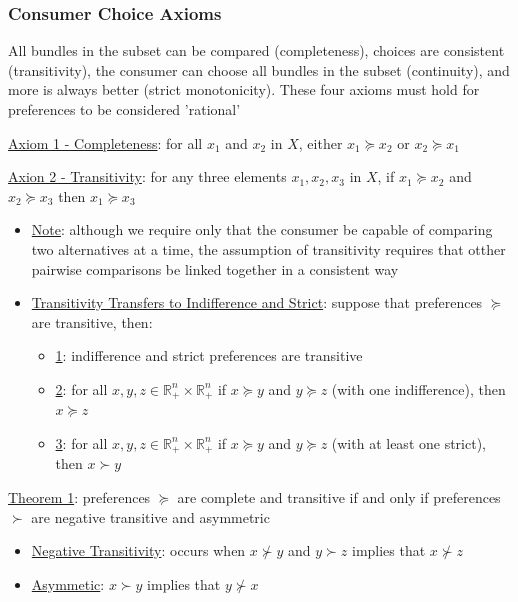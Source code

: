 \documentclass{article}
\begin{document}
\subsubsection{Consumer Choice Axioms}
All bundles in the subset can be compared (completeness), choices are consistent (transitivity), the consumer can choose all bundles in the subset (continuity), and more is always better (strict monotonicity). These four axioms must hold for preferences to be considered 'rational' \par \vspace{0.3em}
  \underline{Axiom 1 - Completeness}: for all $x_{1}$ and $x_{2}$ in $X$, either $x_{1} \succeq x_{2}$ or $x_{2} \succeq x_{1}$ \par
  \underline{Axion 2 - Transitivity}: for any three elements $x_{1}, x_{2}, x_{3}$ in $X$, if $x_{1} \succeq x_{2}$ and $x_{2} \succeq x_{3}$ then $x_{1} \succeq x_{3}$
  \begin{itemize}
    \item  \underline{Note}: although we require only that the consumer be capable of comparing two alternatives at a time, the assumption of transitivity requires that otther pairwise comparisons be linked together in a consistent way
    \item  \underline{Transitivity Transfers to Indifference and Strict}: suppose that preferences $\succeq$ are transitive, then:
    \begin{itemize}
      \item  \underline{1}: indifference and strict preferences are transitive
      \item  \underline{2}: for all $x, y, z \in \mathbb{R}_{+}^{n} \times \mathbb{R}_{+}^{n}$ if $x \succeq y$ and $y \succeq z$ (with one indifference), then $x \succeq z$
      \item  \underline{3}: for all $x, y, z \in \mathbb{R}_{+}^{n} \times \mathbb{R}_{+}^{n}$ if $x \succeq y$ and $y \succeq z$ (with at least one strict), then $x \succ y$
    \end{itemize}
  \end{itemize}
  \underline{Theorem 1}: preferences $\succeq$ are complete and transitive if and only if preferences $\succ$ are negative transitive and asymmetric
  \begin{itemize}
    \item  \underline{Negative Transitivity}: occurs when $x \nsucc y$ and $y \succ z$ implies that $x \nsucc z$
    \item  \underline{Asymmetic}: $x \succ y$ implies that $y \nsucc x$
  \end{itemize}
\end{document}
